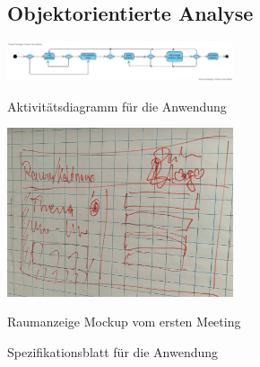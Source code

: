 \subsection{Objektorientierte Analyse}\label{subsec:objektorientierte-analyse}
\par\vspace{1cm}
\centering
\includegraphics[width=0.5\textwidth]{Bilder/Objektorientierte Analyse/Ressource booking activity diagramm}
\caption{Aktivitätsdiagramm für die Anwendung}
\label{fig:aktivitaetsdiagramm}
\newline
\newline
\par\vspace{1cm}
\centering
\includegraphics[width=0.5\textwidth]{Bilder/Raumanzeige_grob.jpeg}
\caption{Raumanzeige Mockup vom ersten Meeting}
\label{fig:raumanzeige-mockup}
\newline
\newline
\newpage

\par\vspace{1cm}
\centering


\caption{Spezifikationsblatt für die Anwendung}
\label{fig:spezifikationsblatt}
\newline
\newline